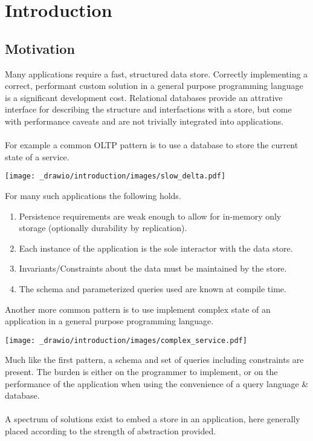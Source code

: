 \chapter{Introduction}
\section{Motivation}
Many applications require a fast, structured data store. Correctly implementing
a correct, performant custom solution in a general purpose programming language is a significant development cost.
Relational databases provide an attrative interface for describing the structure
and interfactions with a store, but come with performance caveats and are not trivially integrated into applications.
\\
\\ For example a common OLTP pattern is to use a database to store the current state of a service.
\begin{center}
    \texttt{[image: \_drawio/introduction/images/slow\_delta.pdf]}
\end{center}
\vspace{-1cm}
\noindent For many such applications the following holds.
\begin{enumerate}
    \setlength\itemsep{0em}
    \item Persistence requirements are weak enough to allow for in-memory only storage (optionally durability by replication).
    \item Each instance of the application is the sole interactor with the data store.
    \item Invariants/Constraints about the data must be maintained by the store.
    \item The schema and parameterized queries used are known at compile time. \label{lab:known_queries_item}
\end{enumerate}
Another more common pattern is to use implement complex state of an application in a general purpose programming language.
\begin{center}
    \texttt{[image: \_drawio/introduction/images/complex\_service.pdf]}
\end{center}
Much like the first pattern, a schema and set of queries including constraints are present. The
burden is either on the programmer to implement, or on the performance of the application when using the
convenience of a query language \& database.
\\
\\ A spectrum of solutions exist to embed a store in an application, here generally placed according to the strength of abstraction provided.
